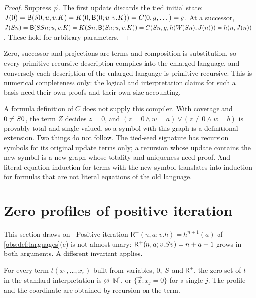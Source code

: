 \begin{proof}
Suppress $\vec p$. The first update discards the tied initial state:
$J(0)=\mathsf{B}(S 0;u,v.K)=K(0,\mathsf{B}(0;u,v.K))=C(0,g,\dots)=g$. At a
successor,
$J(S n)=\mathsf{B}(SS n;u,v.K)=K(S n,\mathsf{B}(S n;u,v.K))
=C(S n,g,h(W(S n),J(n)))=h(n,J(n))$. These hold for arbitrary parameters.
\end{proof}

Zero, successor and projections are terms and composition is substitution, so
every primitive recursive description compiles into the enlarged language, and
conversely each description of the enlarged language is primitive recursive.
This is numerical completeness only; the logical and interpretation claims for
such a basis need their own proofs and their own size accounting.

A formula definition of $C$ does not supply this compiler. With coverage and
$0\ne S 0$, the term $Z$ decides $z=0$, and
$(z=0\wedge w=a)\vee(z\ne 0\wedge w=b)$ is provably total and single-valued, so
a symbol with this graph is a definitional extension. Two things do not follow.
The tied-seed signature has recursion symbols for its original update terms
only; a recursion whose update contains the new symbol is a new graph whose
totality and uniqueness need proof. And literal-equation induction for terms
with the new symbol translates into induction for formulas that are not literal
equations of the old language.

\section{Zero profiles of positive iteration}
\label{obs:sec:zeroprofile}

This section draws on . Positive iteration
$\mathsf{R}^{+}(n,a;v.h)=h^{n+1}(a)$ of \cref{obs:def:languages}(c) is not
almost unary: $\mathsf{R}^{+}(n,a;v.S v)=n+a+1$ grows in both arguments. A
different invariant applies.

\begin{theorem}
\label{obs:thm:zeroprofile}
For every term $t(x_1,\dots,x_r)$ built from variables, $0$, $S$ and
$\mathsf{R}^{+}$, the zero set of $t$ in the standard interpretation is
$\varnothing$, $\mathbb{N}^r$, or $\{\vec x:x_j=0\}$ for a single $j$. The
profile and the coordinate are obtained by recursion on the term.
\end{theorem}

